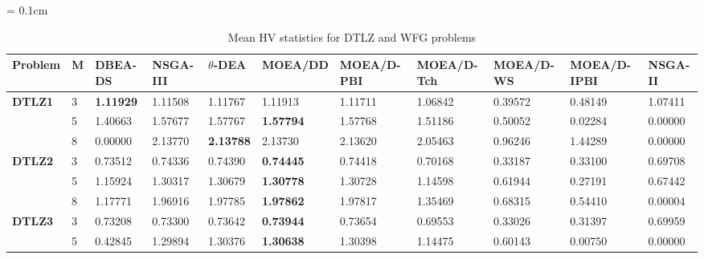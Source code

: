 \documentclass[conference]{IEEEtran}
\begin{document}
\begin{table*}[!htb]\scriptsize
\centering
\renewcommand{\arraystretch}{0.9}
\caption{Mean HV statistics for DTLZ and WFG problems}
\label{tab:HVunc}
\tabcolsep = 0.1cm
\begin{tabular}{|l|l|l|l|l|l|l|l|l|l|l|}
	\noalign{\smallskip}\hline
	\textbf{Problem} & \textbf{M} & \textbf{DBEA-DS} & \textbf{NSGA-III} & \textbf{$\theta$-DEA} & \textbf{MOEA/DD} & \textbf{MOEA/D-PBI} & \textbf{MOEA/D-Tch} & \textbf{MOEA/D-WS} & \textbf{MOEA/D-IPBI} & \textbf{NSGA-II} \\ \hline
	\textbf{DTLZ1}   & 3          & \textbf{1.11929} & 1.11508           & 1.11767               & 1.11913          & 1.11711             & 1.06842             & 0.39572            & 0.48149              & 1.07411          \\ \cline{2-11} 
	\textbf{}        & 5          & 1.40663          & 1.57677           & 1.57767               & \textbf{1.57794} & 1.57768             & 1.51186             & 0.50052            & 0.02284              & 0.00000          \\ \cline{2-11} 
	\textbf{}        & 8          & 0.00000          & 2.13770           & \textbf{2.13788}      & 2.13730          & 2.13620             & 2.05463             & 0.96246            & 1.44289              & 0.00000          \\ \hline
	\textbf{DTLZ2}   & 3          & 0.73512          & 0.74336           & 0.74390               & \textbf{0.74445} & 0.74418             & 0.70168             & 0.33187            & 0.33100              & 0.69708          \\ \cline{2-11} 
	\textbf{}        & 5          & 1.15924          & 1.30317           & 1.30679               & \textbf{1.30778} & 1.30728             & 1.14598             & 0.61944            & 0.27191              & 0.67442          \\ \cline{2-11} 
	\textbf{}        & 8          & 1.17771          & 1.96916           & 1.97785               & \textbf{1.97862} & 1.97817             & 1.35469             & 0.68315            & 0.54410              & 0.00004          \\ \hline
	\textbf{DTLZ3}   & 3          & 0.73208          & 0.73300           & 0.73642               & \textbf{0.73944} & 0.73654             & 0.69553             & 0.33026            & 0.31397              & 0.69959          \\ \cline{2-11} 
	\textbf{}        & 5          & 0.42845          & 1.29894           & 1.30376               & \textbf{1.30638} & 1.30398             & 1.14475             & 0.60143            & 0.00750              & 0.00000          \\ \cline{2-11} 

\end{tabular}
\end{table*}
\end{document}
